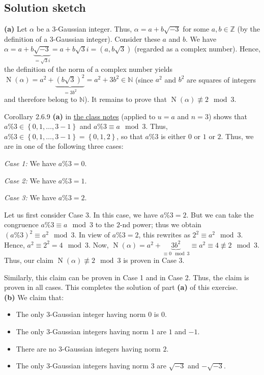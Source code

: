 \documentclass[paper=a4, fontsize=12pt]{scrartcl}%
\newcommand{\NN}{\mathbb{N}}
\newcommand{\ZZ}{\mathbb{Z}}
\newcommand{\set}[1]{\left\{ #1 \right\}}
\newcommand{\tup}[1]{\left( #1 \right)}
\newcommand{\st}{\sqrt{-3}}
\newcommand{\No}{\operatorname{N}}
\theoremstyle{plainsl}
\theoremstyle{definition}
\theoremstyle{remark}
\begin{document}
\subsection{Solution sketch}

\textbf{(a)} Let $\alpha$ be a $3$-Gaussian integer.
Thus, $\alpha = a + b\st$ for some $a, b \in \ZZ$ (by the definition
of a $3$-Gaussian integer). Consider these $a$ and $b$.
We have $\alpha = a + b \underbrace{\st}_{= \sqrt{3} i}
= a + b \sqrt{3} i = \tup{a, b \sqrt{3}}$ (regarded as a complex number).
Hence, the definition of the norm of a complex number yields
$\No \tup{\alpha} = a^2 + \underbrace{\tup{b \sqrt{3}}^2}_{= 3b^2}
= a^2 + 3b^2 \in \NN$ (since $a^2$ and $b^2$ are squares of
integers and therefore belong to $\NN$).
It remains to prove that $\No \tup{\alpha} \not\equiv 2 \mod 3$.

Corollary 2.6.9 \textbf{(a)} in
\href{http://www.cip.ifi.lmu.de/~grinberg/t/19s/notes.pdf}{the class notes}
(applied to $u = a$ and $n = 3$)
shows that $a \% 3 \in \set{0, 1, \ldots, 3-1}$
and $a \% 3 \equiv a \mod 3$.
Thus, $a \% 3 \in \set{0, 1, \ldots, 3-1} = \set{0, 1, 2}$, so that
$a \% 3$ is either $0$ or $1$ or $2$.
Thus, we are in one of the following three cases:

\textit{Case 1:} We have $a \% 3 = 0$.

\textit{Case 2:} We have $a \% 3 = 1$.

\textit{Case 3:} We have $a \% 3 = 2$.

Let us first consider Case 3. In this case, we have $a \% 3 = 2$.
But we can take the congruence $a \% 3 \equiv a \mod 3$ to the $2$-nd power;
thus we obtain $\tup{a \% 3}^2 \equiv a^2 \mod 3$. In view of $a \% 3 = 2$,
this rewrites as $2^2 \equiv a^2 \mod 3$.
Hence, $a^2 \equiv 2^2 = 4 \mod 3$.
Now, $\No \tup{\alpha} = a^2 + \underbrace{3b^2}_{\equiv 0 \mod 3} \equiv a^2
\equiv 4 \not\equiv 2 \mod 3$.
Thus, our claim $\No \tup{\alpha} \not\equiv 2 \mod 3$ is proven in Case 3.

Similarly, this claim can be proven in Case 1 and in Case 2.
Thus, the claim is proven in all cases.
This completes the solution of part \textbf{(a)} of this exercise.
\\[0.4cm]

\textbf{(b)} We claim that:

\begin{itemize}
 \item The only $3$-Gaussian integer having norm $0$ is $0$.
 \item The only $3$-Gaussian integers having norm $1$ are $1$ and $-1$.
 \item There are no $3$-Gaussian integers having norm $2$.
 \item The only $3$-Gaussian integers having norm $3$ are $\st$ and $-\st$.
\end{itemize}
\end{document}
